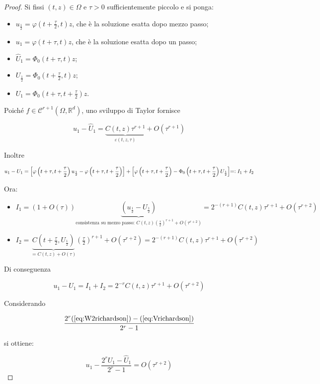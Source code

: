 \documentclass[hidelinks, 10pt]{report}
\begin{document}
\begin{proof}
Si fissi $ (t, z) \in \Omega $ e $ \tau > 0 $ sufficientemente piccolo e si ponga:

\begin{itemize}
\item $ u_{\frac{1}{2}} = \varphi \left( t + \frac{\tau}{2}, t \right) z $, che \`e la soluzione esatta dopo mezzo passo;
\item $ u_{1} = \varphi \left( t + \tau, t \right) z $, che \`e la soluzione esatta dopo un passo;
\item $ \hat{U}_{1} = \Phi_{0} (t + \tau, t) z $;
\item $ U_{\frac{1}{2}} = \Phi_{0} \left( t + \frac{\tau}{2}, t \right) z $;
\item $ U_{1} = \Phi_{0} \left( t + \tau, t + \frac{\tau}{2} \right) z $.
\end{itemize}

Poich\'e $ f \in \mathcal{C}^{r + 1} (\Omega, \mathbb{R}^{d}) $, uno sviluppo di Taylor fornisce

\begin{equation}	\label{eq:Vrichardson}
u_{1} - \hat{U}_{1} = \underbrace{C(t, z) \tau^{r + 1}}_{\varepsilon(t, z, \tau)} + O(\tau^{r + 1})
\end{equation}

Inoltre

\[
{ u_{1} - U_{1} } = { \left[ \varphi \left( t + \tau, t + \frac{\tau}{2} \right) u_{\frac{1}{2}} - \varphi \left( t + \tau, t + \frac{\tau}{2} \right) \right] } + \\ { \left[ \varphi \left( t + \tau, t + \frac{\tau}{2} \right) - \Phi_{0} \left( t + \tau, t + \frac{\tau}{2} \right) U_{\frac{1}{2}} \right] } { =\vcentcolon I_{1} + I_{2} }
\]

Ora:

\begin{itemize}
\item $ I_{1} = (1 + O(\tau)) \underbrace{(u_{\frac{1}{2}} - U_{\frac{1}{2}})}_{\text{consistenza su mezzo passo: } C(t, z) \left( \frac{\tau}{2} \right)^{r + 1} + O(\tau^{r + 2})} = 2^{-(r + 1)} C(t, z) \tau^{r + 1} + O(\tau^{r + 2}) $
\item $ I_{2} = \underbrace{C \left(t + \frac{\tau}{2}, U_{\frac{1}{2}} \right)}_{= C(t, z) + O(\tau)} \left( \frac{\tau}{2} \right)^{r + 1} + O(\tau^{r + 2}) = 2^{-(r + 1)} C(t, z) \tau^{r + 1} + O(\tau^{r + 2}) $
\end{itemize}

Di conseguenza

\begin{equation}	\label{eq:W2richardson}
u_{1} - U_{1} = I_{1} + I_{2} = 2^{-r} C(t, z) \tau^{r + 1} + O(\tau^{r + 2})
\end{equation}

Considerando 

\[ \frac{2^{r} (\ref{eq:W2richardson}) - (\ref{eq:Vrichardson})}{2^{r} - 1} \]

si ottiene:

\[ u_{1} - \frac{2^{r} U_{1} - \hat{U}_{1}}{2^{r} - 1} = O(\tau^{r + 2}) \]
\end{proof}
\end{document}
